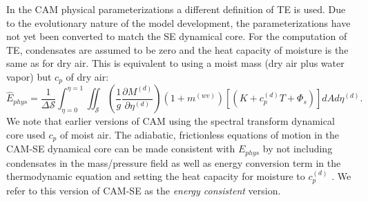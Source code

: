 \documentclass[draft,linenumbers]{agujournal}
\newcommand*{\gi}[1]{\widehat{#1}}
\begin{document}
In the CAM physical parameterizations a different definition of TE is used. Due to the evolutionary nature of the model development, the parameterizations have not yet been converted to match the SE dynamical core. For the computation of TE, condensates are assumed to be zero and the heat capacity of moisture is the same as for dry air. This is equivalent to using a moist mass (dry air plus water vapor) but $c_p$ of dry air:
\begin{equation}
\label{eq:Ephys}
\gi{E}_{phys} =\frac{1}{\Delta \mathcal{S}}\int_{\eta=0}^{\eta=1} \iint_\mathcal{S} \left( \frac{1}{g}\frac{\partial M^{(d)}}{\partial \eta^{(d)}} \right)\left(1+m^{(wv)}\right)\left[ \left(K+c_p^{(d)}T+\Phi_s\right)\right]dA d \eta^{(d)}.
\end{equation}
We note that earlier versions of CAM using the spectral transform dynamical core used $c_p$ of moist air. The adiabatic, frictionless equations of motion in the CAM-SE dynamical core can be made consistent with $E_{phys}$ by not including condensates in the mass/pressure field as well as energy conversion term in the thermodynamic equation and setting the heat capacity for moisture to $c_p^{(d)}$ \citep{T2011LNCSEb}. We refer to this version of CAM-SE as the {\em{energy consistent}} version.
\end{document}
